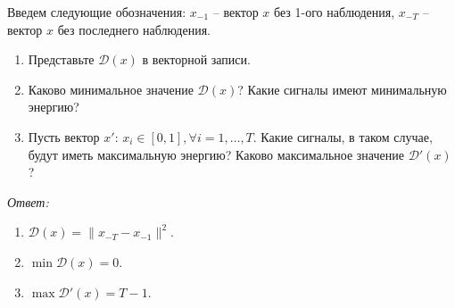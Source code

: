 \documentclass[12pt]{article}
\newcommand{\1}{\mathbb{1}}
\begin{document}
Введем следующие обозначения: \(x_{-1}\)  -- вектор
\(x\) без 1-ого наблюдения, 
\(x_{-T}\)  -- вектор
\(x\) без последнего наблюдения. 

\begin{enumerate}
	\item Представьте \(\mathcal{D}(x)\)  в векторной записи.
	\item Каково минимальное значение \(\mathcal{D}(x)\)?  Какие сигналы имеют минимальную энергию?
	\item Пусть вектор \(x'\):  
	\(x_i \in [0,1], \forall i=1,\dots,T\).  Какие сигналы, в таком случае,  будут иметь  максимальную энергию?  Каково максимальное значение 
	\(\mathcal{D}'(x)\)?  
\end{enumerate}

\textit{Ответ:}

\begin{enumerate}
	\item \(\mathcal{D}(x)=\| x_{-T} - x_{-1} \|^2\).
	\item \(\min \mathcal{D}(x) = 0\).
	\item \(\max \mathcal{D}'(x) = T-1\). 
\end{enumerate}
\end{document}
